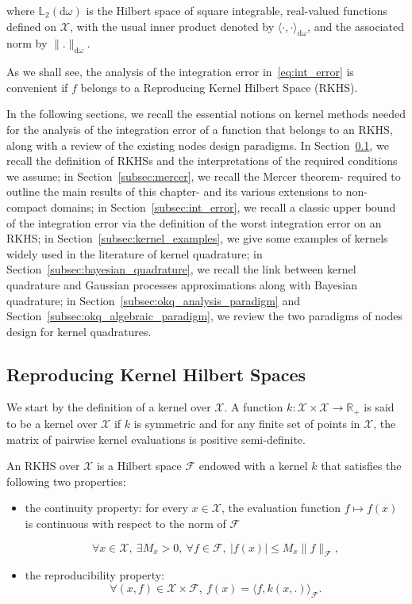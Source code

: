 \documentclass[twoside,11pt]{book}
\begin{document}
where $\mathbb{L}_{2}(\mathrm{d}\omega)$ is the Hilbert space of square integrable, real-valued functions defined on $\mathcal{X}$, with the usual inner product denoted by $\langle \cdot, \cdot \rangle_{\mathrm{d}\omega}$, and the associated norm by $\|.\|_{\mathrm{d}\omega}$.

As we shall see, the analysis of the integration error in~\eqref{eq:int_error} is convenient if $f$ belongs to a Reproducing Kernel Hilbert Space (RKHS).

In the following sections, we recall the essential notions on kernel methods needed for the analysis of the integration error of a function that belongs to an RKHS, along with a review of the existing nodes design paradigms. In Section~\ref{subsec:rkhs}, we recall the definition of RKHSs and the interpretations of the required conditions we assume; in Section~\ref{subsec:mercer}, we recall the Mercer theorem- required to outline the main results of this chapter- and its various extensions to non-compact domains; in Section~\ref{subsec:int_error}, we recall a classic upper bound of the integration error via the definition of the worst integration error on an RKHS; in Section~\ref{subsec:kernel_examples}, we give some examples of kernels widely used in the literature of kernel quadrature; in Section~\ref{subsec:bayesian_quadrature}, we recall the link between kernel quadrature and Gaussian processes approximations along with Bayesian quadrature; in Section~\ref{subsec:okq_analysis_paradigm} and Section~\ref{subsec:okq_algebraic_paradigm}, we review the two paradigms of nodes design for kernel quadratures.
\subsection{Reproducing Kernel Hilbert Spaces}\label{subsec:rkhs}

We start by the definition of a kernel over $\mathcal{X}$. A function $k: \mathcal{X} \times \mathcal{X} \rightarrow \mathbb{R}_{+}$ is said to be a kernel over $\mathcal{X}$ if $k$ is symmetric and for any finite set of points in $\mathcal{X}$, the matrix of pairwise kernel evaluations is positive semi-definite.

An RKHS over $\mathcal{X}$ is a Hilbert space $\mathcal{F}$ endowed with a kernel $k$ that satisfies the following two properties:
\begin{itemize}
\item the continuity property: for every $x \in \mathcal{X}$, the evaluation function $f \mapsto f(x)$ is continuous with respect to the norm of $\mathcal{F}$ 

\begin{equation}
\forall x \in \mathcal{X}, \: \exists M_{x} >0 , \: \forall f \in \mathcal{F}, \: |f(x)| \leq M_{x} \|f\|_{\mathcal{F}},\nonumber
\end{equation} 
\item the reproducibility property:\begin{equation}
\forall (x,f) \in \mathcal{X}\times\mathcal{F}, \: f(x) = \langle f, k(x,.) \rangle_{\mathcal{F}}. \nonumber
\end{equation}
\end{itemize}
 
\end{document}
